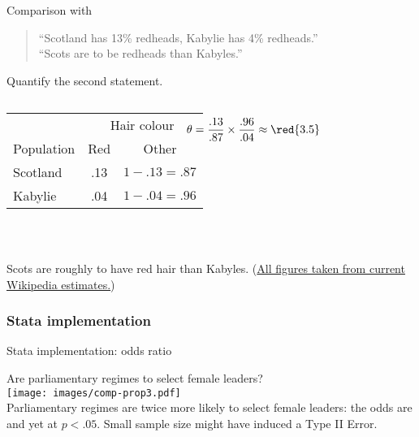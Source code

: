 \documentclass{beamer}
\begin{document}
	\begin{frame}[t]{Comparison with }
					
		\begin{quote}
		``Scotland has 13\% redheads, Kabylie has 4\% redheads.''\\
		``Scots are  to be redheads than Kabyles.''
		\end{quote}
		
		Quantify the second statement.
		
		\begin{columns}[t]
		\vspace{-.5em}
		\begin{center}
		\begin{tabular}{lcc}
			\toprule
			& \multicolumn{2}{c}{Hair colour} \\
			\cmidrule(r){2-3}
			Population & Red & Other \\
			\midrule
			Scotland & .13 & $1-.13=.87$\\
			Kabylie & .04 & $1-.04=.96$ \\
			\bottomrule
		\end{tabular}\\[0em]
	\end{center}
		
	\vspace{3.275em}	
	$$\hspace{-3em}\theta = \frac{.13}{.87}\times\frac{.96}{.04}\approx\red{3.5}$$
	\end{columns}
	
	\vspace{1.5em}
	Scots are roughly  to have red hair than Kabyles. (\href{http://en.wikipedia.org/wiki/Red_hair}{All figures taken from current Wikipedia estimates.})
		
	\end{frame}	

	\subsubsection{Stata implementation}

	\begin{frame}[t]{Stata implementation: odds ratio}

	Are parliamentary regimes  to select female leaders?\\[1em]
	
	\texttt{[image: images/comp-prop3.pdf]}\\[1em]
	
	Parliamentary regimes are twice more likely to select female leaders: the odds are  and yet  at $p < .05$. Small sample size might have induced a Type II Error.
	\end{frame}
	

	
\end{document}
